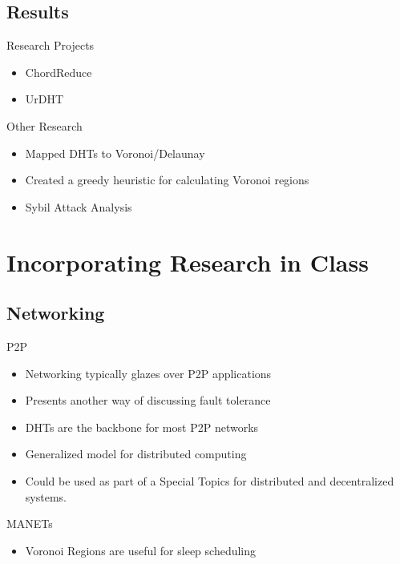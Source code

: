 \documentclass[11pt]{beamer}
\begin{document}
\subsection{Results}

\begin{frame}{Research Projects}
	\begin{itemize}
		\item ChordReduce
		\item UrDHT
	\end{itemize}
\end{frame}



\begin{frame}{Other Research}
	\begin{itemize}
		\item Mapped DHTs to Voronoi/Delaunay
		\item Created a greedy heuristic for calculating Voronoi regions
		\item Sybil Attack Analysis
	\end{itemize}
\end{frame}

\section{Incorporating Research in Class}

\subsection{Networking}

\begin{frame}{P2P}
	\begin{itemize}
		\item Networking typically glazes over P2P applications
		\item Presents another way of discussing fault tolerance
		\item DHTs are the backbone for most P2P networks
		\item Generalized model for distributed computing
		\item Could be used as part of a Special Topics for distributed and decentralized systems.
	\end{itemize}
\end{frame}




\begin{frame}{MANETs}
\begin{itemize}
	\item Voronoi Regions are useful for sleep scheduling
\end{itemize}
\end{frame}
\end{document}
